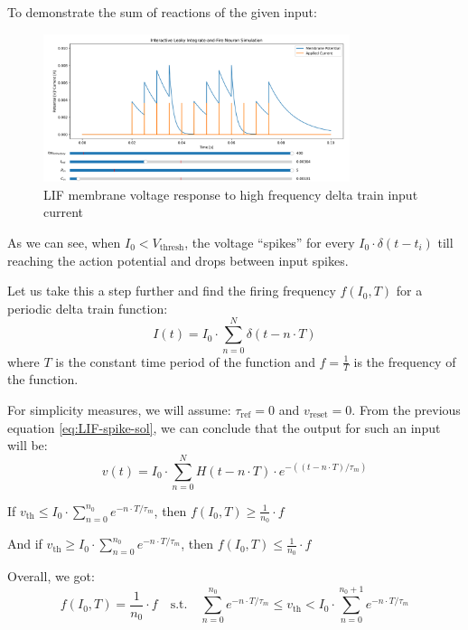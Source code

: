 To demonstrate the sum of reactions of the given input:

\begin{figure}[H]
    \centering
    \includegraphics[width=0.8\textwidth]{methods/computational-models/graphs/LIF-high-freq-spike-response-ref.png}
    \caption{LIF membrane voltage response to high frequency delta train input current}
    \label{fig:LIF-high-freq-spike-ref}
\end{figure}

As we can see, when \(I_0 < V_{\text{thresh}}\), the voltage “spikes” for every \(I_0 \cdot \delta(t-t_i)\) till reaching the action potential and drops between input spikes. 

Let us take this a step further and find the firing frequency \(f(I_0, T)\) for a periodic delta train function:
\begin{equation}
I(t) = I_0 \cdot \sum_{n=0}^N \delta(t-n \cdot T)
\end{equation}
where \(T\) is the constant time period of the function and \(f = \frac{1}{T}\) is the frequency of the function.

For simplicity measures, we will assume: \(\tau_{\text{ref}} = 0\) and \(v_{\text{reset}} = 0\).
From the previous equation \ref{eq:LIF-spike-sol}, we can conclude that the output for such an input will be:
\begin{equation}
v(t) = I_0 \cdot \sum_{n=0}^N H(t-n \cdot T) \cdot e^{-((t-n \cdot T)/\tau_m)}
\end{equation}

If \(v_{\text{th}} \leq I_0 \cdot \sum_{n=0}^{n_0} e^{-n \cdot T/\tau_m}\), then \(f(I_0, T) \geq \frac{1}{n_0} \cdot f\)

And if \(v_{\text{th}} \geq I_0 \cdot \sum_{n=0}^{n_0} e^{-n \cdot T/\tau_m}\), then \(f(I_0, T) \leq \frac{1}{n_0} \cdot f\)

Overall, we got:
\begin{equation}
f(I_0, T) = \frac{1}{n_0} \cdot f \quad \text{s.t.} \quad \sum_{n=0}^{n_0} e^{-n \cdot T/\tau_m} \leq v_{\text{th}} < I_0 \cdot \sum_{n=0}^{n_0+1} e^{-n \cdot T/\tau_m}
\end{equation}

